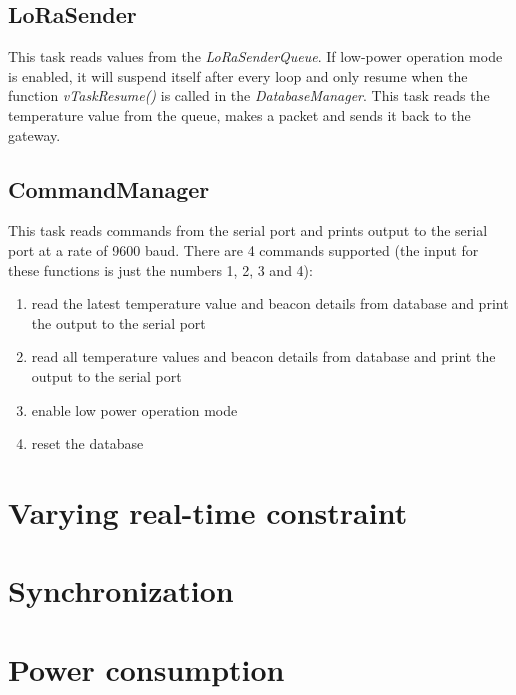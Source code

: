 \documentclass{scrartcl}
\begin{document}
\subsection{LoRaSender}
This task reads values from the \textit{LoRaSenderQueue}. If low-power operation mode is enabled, it will suspend itself after
every loop and only resume when the function \textit{vTaskResume()} is called in the \textit{DatabaseManager}.
This task reads the temperature value from the queue, makes a packet and sends it back to the gateway.

\subsection{CommandManager}
This task reads commands from the serial port and prints output to the serial port at a rate of 9600 baud.
There are 4 commands supported (the input for these functions is just the numbers 1, 2, 3 and 4):
\begin{enumerate}
    \item read the latest temperature value and beacon details from database and print the output to the serial port
    \item read all temperature values and beacon details from database and print the output to the serial port
    \item enable low power operation mode
    \item reset the database
\end{enumerate}

\section{Varying real-time constraint}

\section{Synchronization}

\section{Power consumption}
\end{document}

